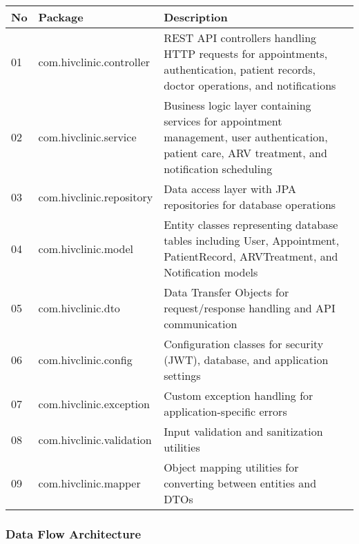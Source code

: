 \documentclass[12pt,a4paper]{article}
\begin{document}
\begin{longtable}{|p{1cm}|p{4cm}|p{9cm}|}
\hline
\textbf{No} & \textbf{Package} & \textbf{Description} \\
\hline
01 & com.hivclinic.controller & REST API controllers handling HTTP requests for appointments, authentication, patient records, doctor operations, and notifications \\
\hline
02 & com.hivclinic.service & Business logic layer containing services for appointment management, user authentication, patient care, ARV treatment, and notification scheduling \\
\hline
03 & com.hivclinic.repository & Data access layer with JPA repositories for database operations \\
\hline
04 & com.hivclinic.model & Entity classes representing database tables including User, Appointment, PatientRecord, ARVTreatment, and Notification models \\
\hline
05 & com.hivclinic.dto & Data Transfer Objects for request/response handling and API communication \\
\hline
06 & com.hivclinic.config & Configuration classes for security (JWT), database, and application settings \\
\hline
07 & com.hivclinic.exception & Custom exception handling for application-specific errors \\
\hline
08 & com.hivclinic.validation & Input validation and sanitization utilities \\
\hline
09 & com.hivclinic.mapper & Object mapping utilities for converting between entities and DTOs \\
\hline
\end{longtable}

\subsubsection{Data Flow Architecture}
\end{document}
